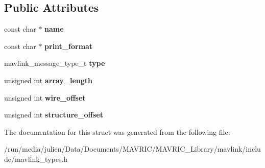 \subsection*{Public Attributes}
\begin{DoxyCompactItemize}
\item 
\hypertarget{struct____mavlink__field__info_a09193c7acc510180ecf6f944381e53c2}{const char $\ast$ {\bfseries name}}\label{struct____mavlink__field__info_a09193c7acc510180ecf6f944381e53c2}

\item 
\hypertarget{struct____mavlink__field__info_af3fc635b6e03851bb683c0c3d57dfc12}{const char $\ast$ {\bfseries print\+\_\+format}}\label{struct____mavlink__field__info_af3fc635b6e03851bb683c0c3d57dfc12}

\item 
\hypertarget{struct____mavlink__field__info_a32f98e7c869ae1567c4ad366c74b6552}{mavlink\+\_\+message\+\_\+type\+\_\+t {\bfseries type}}\label{struct____mavlink__field__info_a32f98e7c869ae1567c4ad366c74b6552}

\item 
\hypertarget{struct____mavlink__field__info_aa3ab268c4176743874c8d05694ed293f}{unsigned int {\bfseries array\+\_\+length}}\label{struct____mavlink__field__info_aa3ab268c4176743874c8d05694ed293f}

\item 
\hypertarget{struct____mavlink__field__info_a7156648575e497f112fde78e851dd4d9}{unsigned int {\bfseries wire\+\_\+offset}}\label{struct____mavlink__field__info_a7156648575e497f112fde78e851dd4d9}

\item 
\hypertarget{struct____mavlink__field__info_acb947cd22e51e70e8b5f677b543196ac}{unsigned int {\bfseries structure\+\_\+offset}}\label{struct____mavlink__field__info_acb947cd22e51e70e8b5f677b543196ac}

\end{DoxyCompactItemize}


The documentation for this struct was generated from the following file\+:\begin{DoxyCompactItemize}
\item 
/run/media/julien/\+Data/\+Documents/\+M\+A\+V\+R\+I\+C/\+M\+A\+V\+R\+I\+C\+\_\+\+Library/mavlink/include/mavlink\+\_\+types.\+h\end{DoxyCompactItemize}
